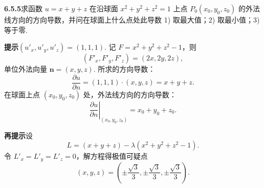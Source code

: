 \documentclass[UTF8,12pt,a4paper,fontset=fandol]{ctexart}
\begin{document}
\noindent\textbf{6.5.5}\quad 求函数 $u=x+y+z$ 在沿球面
$x^2+y^2+z^2=1$ 上点 $P_0(x_0,y_0,z_0)$ 的外法线方向的方向导数，并问在球面上什么点处此导数
1) 取最大值；2) 取最小值；3) 等于零.

\noindent\textbf{提示}\quad $(u'_x,u'_y,u'_z)=(1,1,1)$. 记
$F=x^2+y^2+z^2-1$，则
\[
  (F'_x,F'_y,F'_z)=(2x,2y,2z),
\]
单位外法向量 $\mathbf n=(x,y,z)$. 所求的方向导数：
\[
  \frac{\partial u}{\partial n}=(1,1,1)\cdot(x,y,z)=x+y+z.
\]
在球面上点 $(x_0,y_0,z_0)$ 处，外法线方向的方向导数：
\[
  \left.\frac{\partial u}{\partial n}\right|_{(x_0,y_0,z_0)}
  =
  x_0+y_0+z_0.
\]

\noindent\textbf{再提示}\quad 设
\[
  L=(x+y+z)-\lambda(x^2+y^2+z^2-1).
\]
令 $L'_x=L'_y=L'_z=0$，解方程得极值可疑点
\[
  (x,y,z)=\left(\pm\frac{\sqrt3}{3},\pm\frac{\sqrt3}{3},\pm\frac{\sqrt3}{3}\right).
\]
\end{document}
